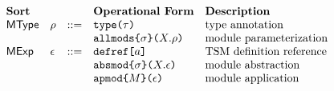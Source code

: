 \[\begin{array}{lllllll}
\textbf{Sort} & & & \textbf{Operational Form} 
& \textbf{Description}\\
\mathsf{MType} & \rho & ::= & \aetype{\tau} 
& \text{type annotation}\\
&&& \aeallmods{\sigma}{X}{\rho} 
& \text{module parameterization}\\
\mathsf{MExp} & \epsilon & ::= & \adefref{a} 
& \text{TSM definition reference}\\
&&& \aeabsmod{\sigma}{X}{\epsilon} 
& \text{module abstraction}\\
&&& \aeapmod{M}{\epsilon} 
& \text{module application}%
\end{array}\]


